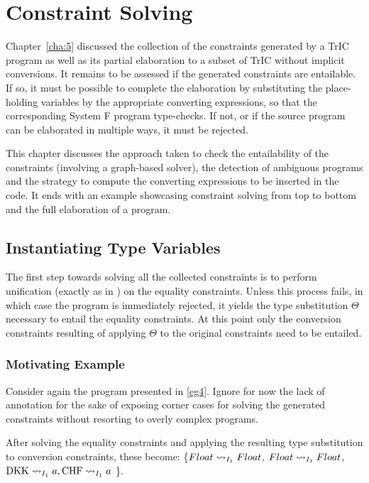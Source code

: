 \chapter{Constraint Solving}
\label{cha:6}

Chapter~\ref{cha:5} discussed the collection of the constraints generated by a TrIC program as well as its partial elaboration to a subset of TrIC without implicit conversions. It remains to be assessed if the generated constraints are entailable. If so, it must be possible to complete the elaboration by substituting the place-holding variables by the appropriate converting expressions, so that the corresponding System F program type-checks. If not, or if the source program can be elaborated in multiple ways, it must be rejected.

This chapter discusses the approach taken to check the entailability of the constraints (involving a graph-based solver), the detection of ambiguous programs and the strategy to compute the converting expressions to be inserted in the code. It ends with an example showcasing constraint solving from top to bottom and the full elaboration of a program.


\section{Instantiating Type Variables}
\label{sc:cc}
The first step towards solving all the collected constraints is to perform unification (exactly as in ) on the equality constraints. Unless this process fails, in which case the program is immediately rejected, it yields the type substitution $\Theta$ necessary to entail the equality constraints. At this point only the conversion constraints resulting of applying $\Theta$ to the original constraints need to be entailed.
\subsection{Motivating Example}
Consider again the program presented in \ref{eg4}. Ignore for now the lack of annotation for the sake of exposing corner cases for solving the generated constraints without resorting to overly complex programs.

After solving the equality constraints and applying the resulting type substitution to conversion constraints, these become: \{$\convX{\imEnv_1}{Float}{Float}$, $\convX{\imEnv_1}{Float}{Float}$, $\convX{\imEnv_1}{\text{DKK}}{a}, \convX{\imEnv_1}{\text{CHF}}{a}$ \}.

